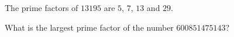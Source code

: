 
\begin{ProjectEuler}{8}
The prime factors of $13195$ are $5$, $7$, $13$ and $29$. \medskip

\noindent What is the largest prime factor of the number $600851475143$?
\end{ProjectEuler}
